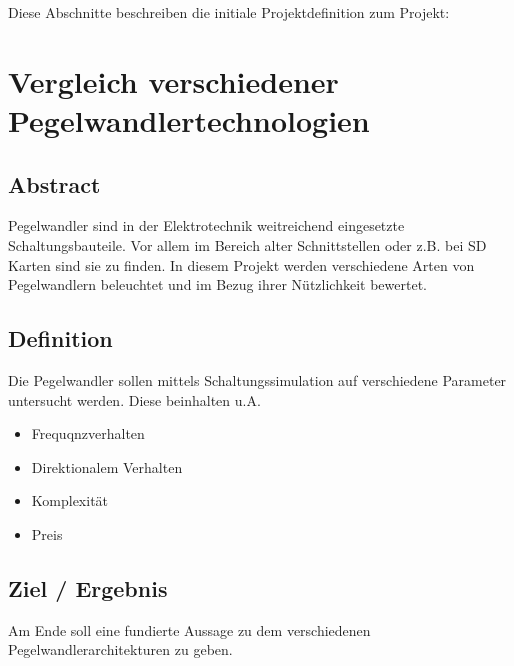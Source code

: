 Diese Abschnitte beschreiben die initiale Projektdefinition zum Projekt:

\section{Vergleich verschiedener Pegelwandlertechnologien 
}\label{sec:proj-title-long}

\subsection{Abstract
}\label{subsec:proj-abstract}

Pegelwandler sind in der Elektrotechnik weitreichend eingesetzte Schaltungsbauteile.
Vor allem im Bereich alter Schnittstellen oder z.B. bei SD Karten sind sie zu finden.
In diesem Projekt werden verschiedene Arten von Pegelwandlern beleuchtet und im Bezug ihrer Nützlichkeit bewertet.

\subsection{Definition
}\label{subsec:proj-def}

Die Pegelwandler sollen mittels Schaltungssimulation auf verschiedene Parameter untersucht werden.
Diese beinhalten u.A. 
\begin{itemize}
  \item Frequqnzverhalten
  \item Direktionalem Verhalten
  \item Komplexität
  \item Preis
\end{itemize}

\subsection{Ziel / Ergebnis
}\label{subsec:proj-target}

Am Ende soll eine fundierte Aussage zu dem verschiedenen Pegelwandlerarchitekturen zu geben.

